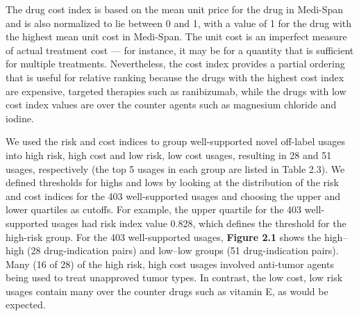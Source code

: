 The drug cost index is based on the mean unit price for the drug in
Medi-Span and is also normalized to lie between 0 and 1, with a value
of 1 for the drug with the highest mean unit cost in Medi-Span.  The
unit cost is an imperfect measure of actual treatment cost — for
instance, it may be for a quantity that is sufficient for multiple
treatments.  Nevertheless, the cost index provides a partial ordering
that is useful for relative ranking because the drugs with the highest
cost index are expensive, targeted therapies such as ranibizumab,
while the drugs with low cost index values are over the counter agents
such as magnesium chloride and iodine.

We used the risk and cost indices to group well-supported novel
off-label usages into high risk, high cost and low risk, low cost
usages, resulting in 28 and 51 usages, respectively (the top 5 usages
in each group are listed in Table 2.3).  We defined thresholds for highs and
lows by looking at the distribution of the risk and cost indices for
the 403 well-supported usages and choosing the upper and lower
quartiles as cutoffs. For example, the upper quartile for the 403
well-supported usages had risk index value 0.828, which defines the
threshold for the high-risk group. For the 403 well-supported usages,
\textbf{Figure 2.1} shows the high–high (28 drug-indication pairs) and
low–low groups (51 drug-indication pairs). Many (16 of 28) of the high
risk, high cost usages involved anti-tumor agents being used to treat
unapproved tumor types. In contrast, the low cost, low risk usages
contain many over the counter drugs such as vitamin E, as would be
expected.

